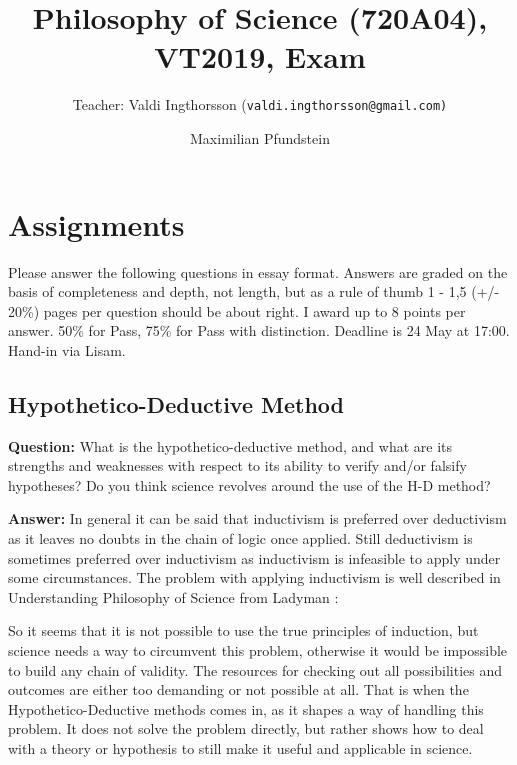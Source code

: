 \documentclass[11pt]{scrartcl}
\title{Philosophy of Science (720A04), VT2019, Exam}
\subtitle{Teacher: Valdi Ingthorsson (\texttt{valdi.ingthorsson@gmail.com)}}
\author{Maximilian Pfundstein}
\begin{document}
\maketitle

\tableofcontents

\newpage

\section{Assignments}

Please answer the following questions in essay format. Answers are graded on the basis of completeness and depth, not length, but as a rule of thumb 1 - 1,5 (+/- 20\%) pages per question should be about right. I award up to 8 points per answer. 50\% for Pass, 75\% for Pass with distinction. Deadline is 24 May at 17:00. Hand-in via Lisam.

\subsection{Hypothetico-Deductive Method}

\textbf{Question:} What is the hypothetico-deductive method, and what are its strengths and weaknesses with respect to its ability to verify and/or falsify hypotheses? Do you think science revolves around the use of the H-D method?

\bigbreak

\textbf{Answer:} In general it can be said that inductivism is preferred over deductivism as it leaves no doubts in the chain of logic once applied. Still deductivism is sometimes preferred over inductivism as inductivism is infeasible to apply under some circumstances. The problem with applying inductivism is well described in Understanding Philosophy of Science from Ladyman \cite[p. 40]{ladyman}: 

So it seems that it is not possible to use the true principles of induction, but science needs a way to circumvent this problem, otherwise it would be impossible to build any chain of validity. The resources for checking out all possibilities and outcomes are either too demanding or not possible at all. That is when the Hypothetico-Deductive methods comes in, as it shapes a way of handling this problem. It does not solve the problem directly, but rather shows how to deal with a theory or hypothesis to still make it useful and applicable in science.
\end{document}
